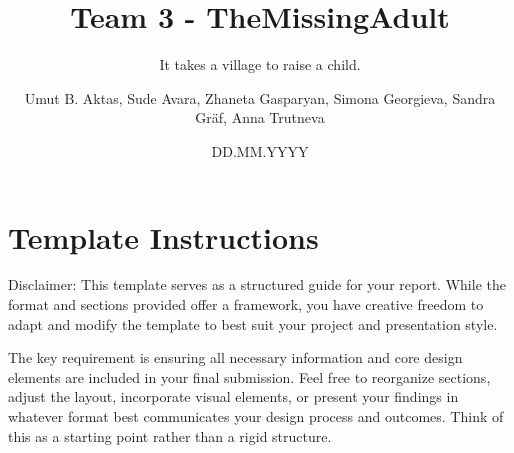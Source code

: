 \documentclass[
	ngerman,%
	accentcolor=9c,%
	type=intern, %
	marginpar=false,%
    parskip=half,%
    logofile=media/tuda_logo.png
]{tudapub}
\title{Team 3 - TheMissingAdult}
\subtitle{It takes a village to raise a child.}
\author{Umut B. Aktas, Sude Avara, Zhaneta Gasparyan, Simona Georgieva, Sandra Gräf, Anna Trutneva}
\date{DD.MM.YYYY}
\begin{document}
\maketitle

\tableofcontents


\section{Template Instructions}
Disclaimer: This template serves as a structured guide for your report. While the format and sections provided offer a framework, you have  creative freedom to adapt and modify the template to best suit your project and presentation style. 

The key requirement is ensuring all necessary information and core design  elements are included in your final submission. Feel free to reorganize sections, adjust the layout, incorporate visual elements, or present your findings in whatever format best communicates your design process and outcomes. Think of this as a starting point rather than a rigid structure. 




















\end{document}
